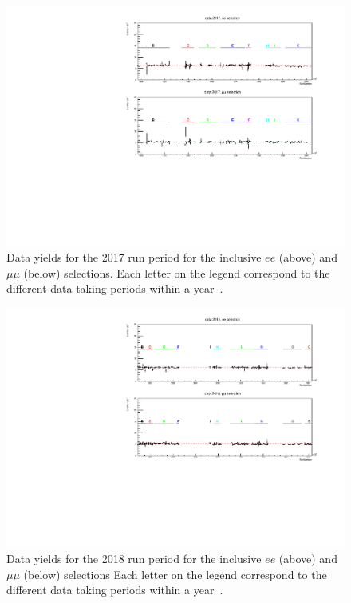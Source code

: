 \begin{figure}[ht]
\centering
\includegraphics[width=\textwidth]{figures/analysis/datamc/Yields/compare_data_yields2017.pdf}
\caption{Data yields for the 2017 run period for the inclusive $ee$ (above) and $\mu\mu$ (below) selections. Each letter on the legend correspond to the different data taking periods within a year~\cite{Aad:2019fac}.}
\label{fig:yields2017}
\end{figure}

\begin{figure}[ht]
\centering
\includegraphics[width=\textwidth]{figures/analysis/datamc/Yields/compare_data_yields2018.pdf}
\caption{Data yields for the 2018 run period for the inclusive $ee$ (above) and $\mu\mu$ (below) selections Each letter on the legend correspond to the different data taking periods within a year~\cite{Aad:2019fac}.}
\label{fig:yields2018}
\end{figure}

